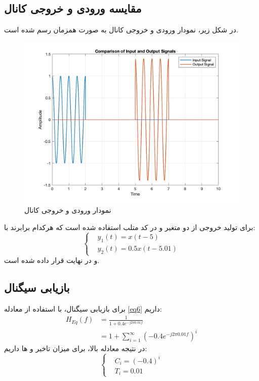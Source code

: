 \documentclass[10pt]{article}
\begin{document}
\subsection{مقایسه ورودی و خروجی کانال}
در شکل زیر، نمودار ورودی و خروجی کانال به صورت همزمان رسم شده است.
\begin{figure}[h]
	\centering
	\includegraphics[width=0.9\linewidth]{../pics/q2-5}
	\caption{نمودار ورودی و خروجی کانال}
	\label{fig:q2-5}
\end{figure}

\noindent
برای تولید خروجی از دو متغیر 
و 
در کد متلب استفاده شده است که هرکدام برابرند با:
\begin{equation*}
	\begin{cases}
		& y_1(t) = x(t-5)\\
		& y_2(t) = 0.5x(t-5.01)
	\end{cases}
\end{equation*}
و در نهایت 
قرار داده شده است.
\newpage
\subsection{بازیابی سیگنال}
برای بازیابی سیگنال، با استفاده از معادله
 \eqref{eq6}
داریم:
\begin{equation}
	\begin{split}
		H_{Eq}(f) &= \frac{1}{1 + 0.4e^{-j2\pi 0.01f}}\\
		&= 1 + \sum_{i=1}^{\infty} (-0.4e^{-j2\pi 0.01f})^i
	\end{split}
\end{equation}
در نتیجه معادله بالا، برای میزان تاخیر و 
ها داریم:
\begin{equation}
	\begin{cases}
		&C_i = (-0.4)^i \\
		&T_i = 0.01
	\end{cases}
\end{equation}
\end{document}
